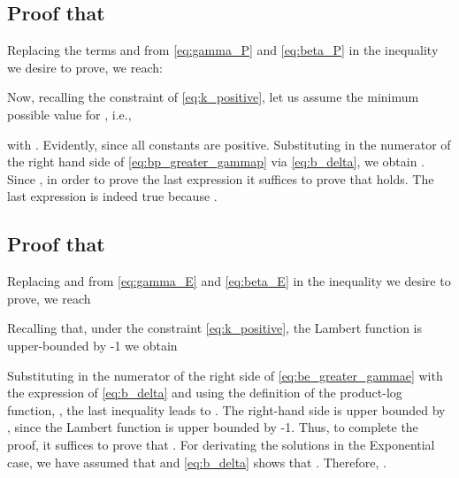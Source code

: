 \documentclass[twocolumn,english]{IEEEtran}
\theoremstyle{plain}
\theoremstyle{definition}
\begin{document}
\subsection{Proof that  }

\label{subsec:ff2}Replacing the terms  and 
from \eqref{eq:gamma_P} and \eqref{eq:beta_P} in the inequality
we desire to prove, we reach:




\noindent Now, recalling the constraint of \eqref{eq:k_positive},
let us assume the minimum possible value for , i.e.,




\noindent with . Evidently,  since all constants
are positive. Substituting  in the numerator of the right hand
side of \eqref{eq:bp_greater_gammap} via \eqref{eq:b_delta}, we
obtain .
Since , in order to prove the last expression it suffices
to prove that 
holds. The last expression is indeed true because .


\subsection{Proof that  }

\label{subsec:ff3}Replacing  and 
from \eqref{eq:gamma_E} and \eqref{eq:beta_E} in the inequality
we desire to prove, we reach

\noindent 

Recalling that, under the constraint \eqref{eq:k_positive}, the Lambert
 function is upper-bounded by -1 we obtain

\noindent 



\noindent Substituting  in the numerator of the right side of
\eqref{eq:be_greater_gammae} with the expression of \eqref{eq:b_delta}
and using the definition of the product-log function, ,
the last inequality leads to .
The right-hand side is upper bounded by , since the Lambert
function is upper bounded by -1. Thus, to complete the proof, it suffices
to prove that . For derivating the solutions in the Exponential
case, we have assumed that  and \eqref{eq:b_delta} shows that
. Therefore, .{} 

\balance
\end{document}
